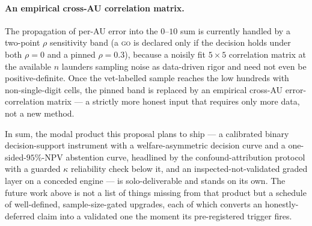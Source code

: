 \paragraph{An empirical cross-AU correlation matrix.}
The propagation of per-AU error into the $0$--$10$ sum is currently handled by a
two-point $\rho$ sensitivity band (a \textsc{go} is declared only if the decision
holds under both $\rho{=}0$ and a pinned $\rho{=}0.3$), because a noisily fit
$5\times 5$ correlation matrix at the available $n$ launders sampling noise as
data-driven rigor and need not even be positive-definite. Once the vet-labelled
sample reaches the low hundreds with non-single-digit cells, the pinned band is
replaced by an empirical cross-AU error-correlation matrix --- a strictly more
honest input that requires only more data, not a new method.

\bigskip
\noindent In sum, the modal product this proposal plans to ship --- a calibrated
binary decision-support instrument with a welfare-asymmetric decision curve and a
one-sided-$95\%$-NPV abstention curve, headlined by the confound-attribution
protocol with a guarded $\kappa$ reliability check below it, and an
inspected-not-validated graded layer on a conceded engine --- is solo-deliverable
and stands on its own. The future work above is not a list of things missing from
that product but a schedule of well-defined, sample-size-gated upgrades, each of
which converts an honestly-deferred claim into a validated one the moment its
pre-registered trigger fires.
